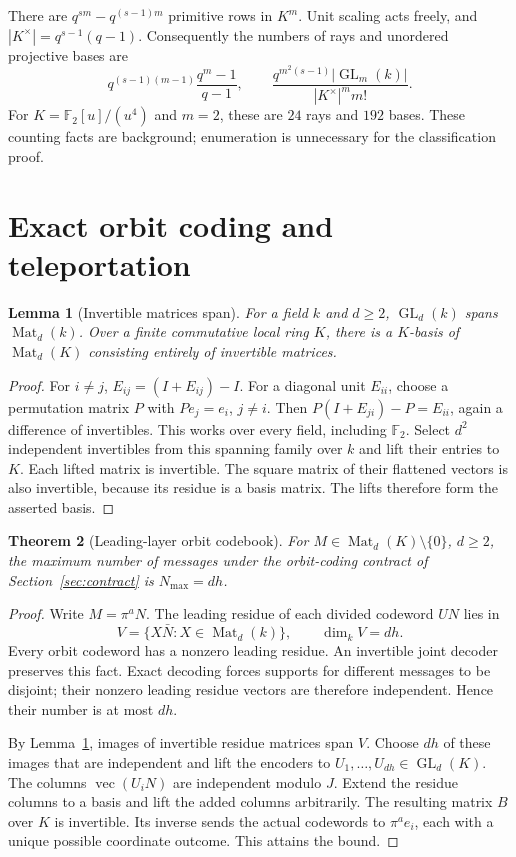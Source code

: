 \documentclass[11pt]{article}
\newtheorem{theorem}{Theorem}[section]
\newtheorem{lemma}[theorem]{Lemma}
\theoremstyle{definition}\newtheorem{definition}[theorem]{Definition}
\theoremstyle{remark}\newtheorem{remark}[theorem]{Remark}
\newcommand{\F}{\mathbb F}
\newcommand{\A}{\F_2[u]/(u^4)}
\DeclareMathOperator{\GL}{GL}
\DeclareMathOperator{\Mat}{Mat}
\begin{document}
There are $q^{sm}-q^{(s-1)m}$ primitive rows in $K^m$. Unit scaling acts freely, and $|K^\times|=q^{s-1}(q-1)$. Consequently the numbers of rays and unordered projective bases are
\[
 q^{(s-1)(m-1)}\frac{q^m-1}{q-1},\qquad
 \frac{q^{m^2(s-1)}|\GL_m(k)|}{|K^\times|^m m!}.
\]
For $K=\A$ and $m=2$, these are $24$ rays and $192$ bases. These counting facts are background; enumeration is unnecessary for the classification proof.

\section{Exact orbit coding and teleportation}\label{sec:tasks}
\begin{lemma}[Invertible matrices span]\label{lem:span}
For a field $k$ and $d\geq2$, $\GL_d(k)$ spans $\Mat_d(k)$. Over a finite commutative local ring $K$, there is a $K$-basis of $\Mat_d(K)$ consisting entirely of invertible matrices.
\end{lemma}
\begin{proof}
For $i\ne j$, $E_{ij}=(I+E_{ij})-I$. For a diagonal unit $E_{ii}$, choose a permutation matrix $P$ with $Pe_j=e_i$, $j\ne i$. Then $P(I+E_{ji})-P=E_{ii}$, again a difference of invertibles. This works over every field, including $\F_2$. Select $d^2$ independent invertibles from this spanning family over $k$ and lift their entries to $K$. Each lifted matrix is invertible. The square matrix of their flattened vectors is also invertible, because its residue is a basis matrix. The lifts therefore form the asserted basis.
\end{proof}

\begin{theorem}[Leading-layer orbit codebook]\label{thm:code}
For $M\in\Mat_d(K)\setminus\{0\}$, $d\geq2$, the maximum number of messages under the orbit-coding contract of Section~\ref{sec:contract} is $N_{\max}=dh$.
\end{theorem}
\begin{proof}
Write $M=\pi^aN$. The leading residue of each divided codeword $UN$ lies in
\[
 V=\{X\bar N:X\in\Mat_d(k)\},\qquad \dim_k V=dh.
\]
Every orbit codeword has a nonzero leading residue. An invertible joint decoder preserves this fact. Exact decoding forces supports for different messages to be disjoint; their nonzero leading residue vectors are therefore independent. Hence their number is at most $dh$.

By Lemma~\ref{lem:span}, images of invertible residue matrices span $V$. Choose $dh$ of these images that are independent and lift the encoders to $U_1,\ldots,U_{dh}\in\GL_d(K)$. The columns $\operatorname{vec}(U_iN)$ are independent modulo $J$. Extend the residue columns to a basis and lift the added columns arbitrarily. The resulting matrix $B$ over $K$ is invertible. Its inverse sends the actual codewords to $\pi^ae_i$, each with a unique possible coordinate outcome. This attains the bound.
\end{proof}
\end{document}
